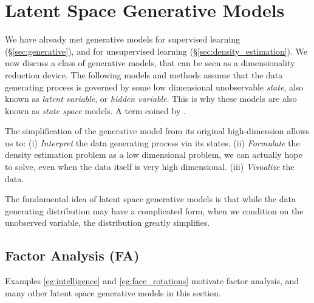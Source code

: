 \begin{remark}
\end{remark}















\section{Latent Space Generative Models}
\label{sec:latent_space}

We have already met generative models for supervised learning (\S\ref{sec:generative}), and for unsupervised learning (\S\ref{sec:density_estimation}).
We now discuss a class of generative models, that can be seen as a dimensionality reduction device. 
The following models and methods assume that the data generating process is governed by some low dimensional unobservable \emph{state}, also known as \emph{latent variable}, or \emph{hidden variable}.
This is why these models are also known as \emph{state space} models. A term coined by  \citet{kalman_contributions_1960}.

The simplification of the generative model from its original high-dimension allows us to:
(i) \emph{Interpret} the data generating process via its states. 
(ii) \emph{Formulate} the density estimation problem as a low dimensional problem, we can actually hope to solve, even when the data itself is very high dimensional.
(iii) \emph{Visualize} the data. 

The fundamental idea of latent space generative models is that while the data generating distribution may have a complicated form, when we condition on the unobserved variable, the distribution greatly simplifies. 



\subsection{Factor Analysis (FA)}
\label{sec:factor_analysis}

Examples \ref{eg:intelligence} and \ref{eg:face_rotations} motivate factor analysis, and many other latent space generative models in this section.

